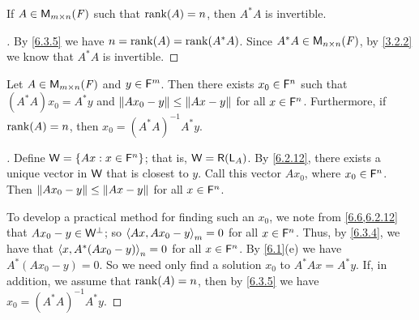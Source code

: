\begin{cor}\label{6.3.6}
	If \(A \in \ms\) such that \(\rk{A} = n\), then \(A^* A\) is invertible.
\end{cor}

\begin{proof}[]
	By \cref{6.3.5} we have \(n = \rk{A} = \rk{A^* A}\).
	Since \(A^* A \in \ms[n][n][\F]\), by \cref{3.2.2} we know that \(A^* A\) is invertible.
\end{proof}

\begin{thm}\label{6.12}
	Let \(A \in \ms\) and \(y \in \mathsf{F}^m\).
	Then there exists \(x_0 \in \mathsf{F}^n\) such that \((A^* A) x_0 = A^* y\) and \(\left\lVert A x_0 - y\right\rVert \leq \left\lVert Ax - y\right\rVert\) for all \(x \in \mathsf{F}^n\).
	Furthermore, if \(\rk{A} = n\), then \(x_0 = (A^* A)^{-1} A^* y\).
\end{thm}

\begin{proof}[]
	Define \(\mathsf{W} = \left\lbrace Ax : x \in \mathsf{F}^n\right\rbrace\);
	that is, \(\W = \rg{\L_A}\).
	By \cref{6.2.12}, there exists a unique vector in \(\mathsf{W}\) that is closest to \(y\).
	Call this vector \(A x_0\), where \(x_0 \in \mathsf{F}^n\).
	Then \(\left\lVert A x_0 - y\right\rVert \leq \left\lVert Ax - y\right\rVert\) for all \(x \in \mathsf{F}^n\).

	To develop a practical method for finding such an \(x_0\), we note from \cref{6.6,6.2.12} that \(A x_0 - y \in \mathsf{W}^{\perp}\);
	so \(\left\langle Ax, A x_0 - y\right\rangle_m = 0\) for all \(x \in \mathsf{F}^n\).
	Thus, by \cref{6.3.4}, we have that \(\left\langle x, A^* (A x_0 - y)\right\rangle_n = 0\) for all \(x \in \mathsf{F}^n\).
	By \cref{6.1}(e) we have \(A^* (A x_0 - y) = 0\).
	So we need only find a solution \(x_0\) to \(A^* Ax = A^* y\).
	If, in addition, we assume that \(\rk{A} = n\), then by \cref{6.3.5} we have \(x_0 = (A^* A)^{-1} A^* y\).
\end{proof}

